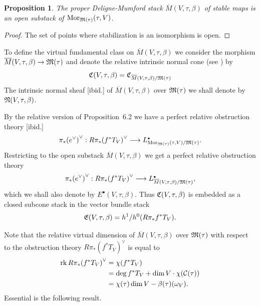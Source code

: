\documentclass{article}
\newtheorem{prop}{Proposition}
\newcommand{\dual}[1]{{{#1}^{\vee}}}
\newcommand{\upst}{^{\ast}}
\newcommand{\lst}{_{\ast}}
\newcommand{\com}{^{\scriptscriptstyle\bullet}}
\newcommand{\EE}{{\frak E}}
\newcommand{\NN}{{\frak N}}
\newcommand{\MM}{{\frak M}}
\newcommand{\CC}{{\frak C}}
\newcommand{\cC}{{\cal C}}
\newcommand{\rk}{\mathop{\rm rk}}
\newcommand{\Mor}{\mathop{\rm Mor}\nolimits}
\newcommand{\ol}{\overline}
\begin{document}
\begin{prop}
The proper Deligne-Mumford stack $\ol{M}(V,\tau,\beta)$ of stable maps
is an open substack of $\Mor_{\MM(\tau)}(\tau,V)$.
\end{prop}
\begin{proof}
The set of points where stabilization is an isomorphism is open.
\end{proof}

To define the virtual fundamental class on $\ol{M}(V,\tau,\beta)$ we
consider the morphism $\ol{M}(V,\tau,\beta)\rightarrow\MM(\tau)$ and
denote the relative intrinsic normal cone (see \cite{BF}) by
$$\CC(V,\tau,\beta)=\CC_{\ol{M}(V,\tau,\beta)/\MM(\tau)}$$ The
intrinsic normal sheaf [ibid.] of $\ol{M}(V,\tau,\beta)$ over
$\MM(\tau)$ we shall denote by $\NN(V,\tau,\beta)$.

By the relative version of \cite{BF} Proposition~6.2 we have a perfect
relative obstruction theory [ibid.]
\[\dual{\pi\lst(\dual{e})}:\dual{R\pi\lst(f\upst T_V)}\longrightarrow
L_{\Mor_{\MM(\tau)}(\tau,V)/\MM(\tau)}\com.\] Restricting to the open
substack $\ol{M}(V,\tau,\beta)$ we get a perfect relative obstruction theory
\[\dual{\pi\lst(\dual{e})}:\dual{R\pi\lst(f\upst T_V)}\longrightarrow
L_{\ol{M}(V,\tau,\beta)/\MM(\tau)}\com,\]
which we shall also denote by $E\com(V,\tau,\beta)$.
Thus $\CC(V,\tau,\beta)$ is embedded as a closed subcone stack in the
vector bundle stack $$\EE(V,\tau,\beta)=h^1/h^0(R\pi\lst f\upst
T_V).$$

Note that the relative virtual
dimension of $\ol{M}(V,\tau,\beta)$ over $\MM(\tau)$ with respect to the
obstruction theory $\dual{R\pi\lst(f\upst T_V)}$ is equal to
\begin{align*}
\rk\dual{R\pi\lst(f\upst T_V)} & = \chi(f\upst T_V) \\
 & = \deg f\upst T_V+\dim V\cdot\chi(\cC(\tau)) \\
 & = \chi(\tau)\dim V-\beta(\tau)(\omega_V).
\end{align*} Essential is the following result.
\end{document}

